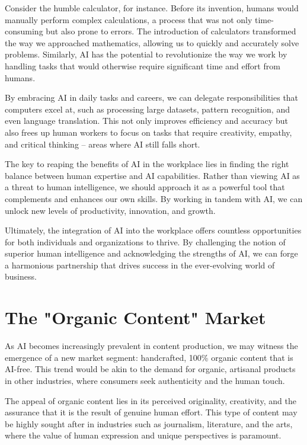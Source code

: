Consider the humble calculator, for instance. Before its invention, humans would manually perform complex calculations, a process that was not only time-consuming but also prone to errors. The introduction of calculators transformed the way we approached mathematics, allowing us to quickly and accurately solve problems. Similarly, AI has the potential to revolutionize the way we work by handling tasks that would otherwise require significant time and effort from humans.

By embracing AI in daily tasks and careers, we can delegate responsibilities that computers excel at, such as processing large datasets, pattern recognition, and even language translation. This not only improves efficiency and accuracy but also frees up human workers to focus on tasks that require creativity, empathy, and critical thinking – areas where AI still falls short.

The key to reaping the benefits of AI in the workplace lies in finding the right balance between human expertise and AI capabilities. Rather than viewing AI as a threat to human intelligence, we should approach it as a powerful tool that complements and enhances our own skills. By working in tandem with AI, we can unlock new levels of productivity, innovation, and growth.

Ultimately, the integration of AI into the workplace offers countless opportunities for both individuals and organizations to thrive. By challenging the notion of superior human intelligence and acknowledging the strengths of AI, we can forge a harmonious partnership that drives success in the ever-evolving world of business.

\section{The "Organic Content" Market}

As AI becomes increasingly prevalent in content production, we may witness the emergence of a new market segment: handcrafted, 100\% organic content that is AI-free. This trend would be akin to the demand for organic, artisanal products in other industries, where consumers seek authenticity and the human touch.

The appeal of organic content lies in its perceived originality, creativity, and the assurance that it is the result of genuine human effort. This type of content may be highly sought after in industries such as journalism, literature, and the arts, where the value of human expression and unique perspectives is paramount.

